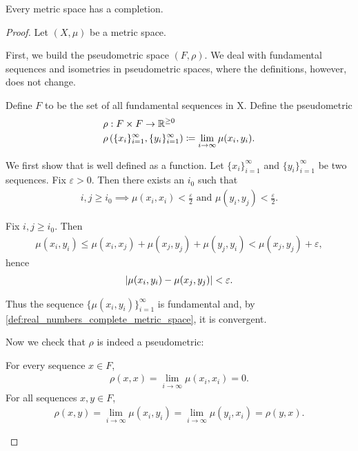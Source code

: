 \begin{theorem}\label{thm:metric_space_completion_existence}
  Every metric space has a completion.
\end{theorem}
\begin{proof}
  Let $(X, \mu)$ be a metric space.

  \begin{defenum}
    \item\label{thm:metric_space_completion_existence/part_a} First, we build the pseudometric space $(F, \rho)$. We deal with fundamental sequences and isometries in pseudometric spaces, where the definitions, however, does not change.

     Define $F$ to be the set of all fundamental sequences in X. Define the pseudometric
    \begin{align*}
      &\rho: F \times F \to \mathbb R^{\geq 0} \\
      &\rho\left( \{ x_i \}_{i=1}^\infty, \{ y_i \}_{i=1}^\infty \right) \coloneqq \lim_{i \to \infty} \mu(x_i, y_i).
    \end{align*}

    We first show that is well defined as a function. Let $\{ x_i \}_{i=1}^\infty$ and $\{ y_i \}_{i=1}^\infty$ be two sequences. Fix $\varepsilon > 0$. Then there exists an $i_0$ such that
    \begin{align*}
      i, j \geq i_0 \implies \mu(x_i, x_i) < \tfrac \varepsilon 2 \text{ and } \mu(y_i, y_j) < \tfrac \varepsilon 2.
    \end{align*}

    Fix $i, j \geq i_0$. Then
    \begin{align*}
      \mu(x_i, y_i) \leq \mu(x_i, x_j) + \mu(x_j, y_j) + \mu(y_j, y_i) < \mu(x_j, y_j) + \varepsilon,
    \end{align*}
    hence
    \begin{align*}
      \left\vert \mu(x_i, y_i) - \mu(x_j, y_j) \right\vert < \varepsilon.
    \end{align*}

    Thus the sequence $\{ \mu(x_i, y_i) \}_{i=1}^\infty$ is fundamental and, by \cref{def:real_numbers_complete_metric_space}, it is convergent.

    Now we check that $\rho$ is indeed a pseudometric:
    \begin{description}
       For every sequence $x \in F$,
      \begin{align*}
        \rho(x, x) = \lim_{i \to \infty} \mu(x_i, x_i) = 0.
      \end{align*}
       For all sequences $x, y \in F$,
      \begin{align*}
        \rho(x, y) = \lim_{i \to \infty} \mu(x_i, y_i) = \lim_{i \to \infty} \mu(y_i, x_i) = \rho(y, x).
      \end{align*}


\end{description}
\end{defenum}
\end{proof}
